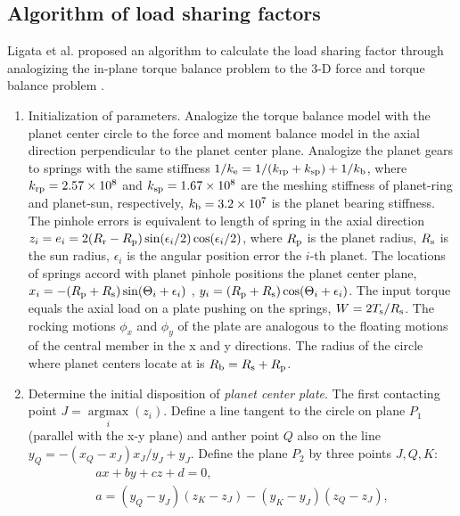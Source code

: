 \documentclass[a4paper,fleqn]{cas-sc}%
\begin{document}
\subsection{Algorithm of load sharing factors\label{sec:algorithm_load_sharing}}
\par Ligata et al. proposed an algorithm to calculate the load sharing factor through analogizing the in-plane torque balance problem to the 3-D force and torque balance problem \cite{Ligata2009}.
\begin{enumerate}
    \item Initialization of parameters. Analogize the torque balance model with the planet center circle to the force and moment balance model in the axial direction perpendicular to the planet center plane.  Analogize the planet gears to springs with the same stiffness $1/k_{\rm e}=1/(k_{\rm rp}+k_{\rm sp})+1/k_{\rm b}$, where $k_{\rm rp}=2.57\times 10^8$ and $k_{\rm sp}=1.67\times 10^8$ are the meshing stiffness of planet-ring and planet-sun, respectively, $k_{\rm b}=3.2\times 10^7$ is the planet bearing stiffness. The pinhole errors is equivalent to length of spring in the axial direction $z_i=e_i=2(R_{\rm r}-R_{\rm p})\sin(\epsilon_i/2)\cos(\epsilon_i/2)$, where $R_{\rm p}$ is the planet radius, $R_{\rm s}$ is the sun radius, $\epsilon_{i}$ is the angular position error the $i$-th planet. The locations of springs accord with planet pinhole positions the planet center plane, $x_i=-(R_{\rm p}+R_{\rm s})\sin(\Theta_i+\epsilon_i)$ , $y_i=(R_{\rm p}+R_{\rm s})\cos(\Theta_i+\epsilon_i)$. The input torque equals the axial load on a plate pushing on the springs, $W=2T_{\rm s}/R_{\rm s}$.  The rocking motions $\phi_x$ and $\phi_y$ of the plate are analogous to the floating motions of the central member in the x and y directions. The radius of the circle where planet centers locate at is $R_{\rm b}=R_{\rm s}+R_{\rm p}$.
    \item Determine the initial disposition of \textit{planet center plate}. The first contacting point $J=\mathop{\arg\max}\limits_{i}(z_i)$. Define a line  tangent to the circle on plane  $P_1$ (parallel with the x-y plane) and anther point $Q$ also on the line $y_Q=-(x_Q-x_J)x_J/y_J+y_J$. Define the plane $P_2$ by three points $J, Q, K$:
    \begin{equation}
        \begin{split}
        a x+ b y+ c z+ d=0,\\
        a= \left(y_Q-y_J\right)\left(z_K-z_J\right)-\left(y_K-y_J\right) \left(z_Q-z_J\right),\\

\end{split}
\end{equation}
\end{enumerate}
\end{document}
